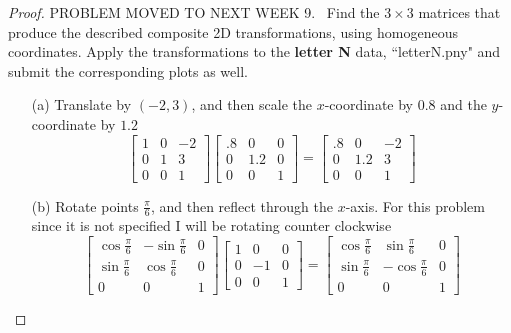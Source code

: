 \documentclass[12pt]{article}
\begin{document}
\begin{proof}
  PROBLEM MOVED TO NEXT WEEK
  9.~  Find the $ 3 \times 3$ matrices that produce the described composite 2D transformations, using homogeneous coordinates. Apply the transformations to the {\bf letter N} data, ``letterN.pny" and submit the corresponding plots as well.
  \begin{itemize}
  \item[(a)] Translate by $(-2, 3)$, and then scale the $x$-coordinate by $0.8$ and the $y$-coordinate by $1.2$
  \[

    \begin{bmatrix}
      1&0&-2\\
      0&1&3\\
      0&0&1
    \end{bmatrix}
      \begin{bmatrix}
        .8&0&0\\
        0&1.2&0\\
        0&0&1
      \end{bmatrix}=\begin{bmatrix}
        .8&0&-2\\
        0&1.2&3\\
        0&0&1
      \end{bmatrix}
  \]
  \item[(b)] Rotate points $\frac{\pi}{6}$, and then reflect through the $x$-axis.
  For this problem since it is not specified I will be rotating counter clockwise
  \[
  \renewcommand{\arraystretch}{2.5}
    \begin{bmatrix}
      \cos{\frac{\pi}{6}}&-\sin{\frac{\pi}{6}}&0\\
      \sin{\frac{\pi}{6}}& \cos{\frac{\pi}{6}}&0\\
      0&0&1
    \end{bmatrix}
    \begin{bmatrix}
    1&0&0\\
          0&-1&0\\
      0&0&1
    \end{bmatrix}=\begin{bmatrix}
      \cos{\frac{\pi}{6}}&\sin{\frac{\pi}{6}}&0\\
      \sin{\frac{\pi}{6}}& -\cos{\frac{\pi}{6}}&0\\
      0&0&1
    \end{bmatrix}
  \]
  \end{itemize}
\end{proof}
\end{document}

